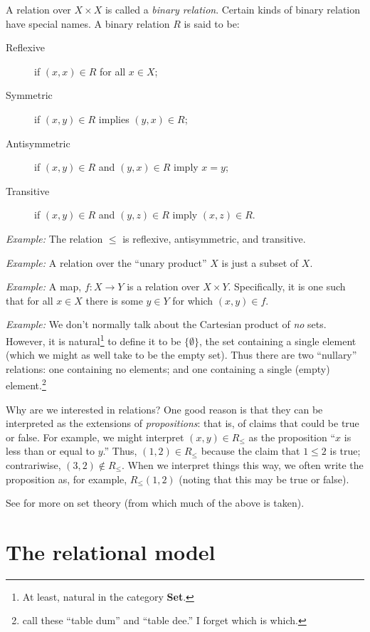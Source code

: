 \documentclass[10pt, a4paper, twocolumn]{article}
\begin{document}
A relation over $X\times X$ is called a \emph{binary relation}. Certain
kinds of binary relation have special names. A binary relation $R$ is said to
be:
\begin{description}
\item[Reflexive] if $(x, x)\in R$ for all $x\in X$;
\item[Symmetric] if $(x, y)\in R$ implies $(y,x)\in R$;
\item[Antisymmetric] if $(x, y)\in R$ and $(y, x)\in R$ imply $x = y$;
\item[Transitive] if $(x, y) \in R$ and $(y, z) \in R$ imply $(x, z) \in R$.
\end{description}

\emph{Example:} The relation $\leq$ is reflexive, antisymmetric, and transitive.

\emph{Example:} A relation over the ``unary product'' $X$ is just a subset of
$X$.

\emph{Example:} A map, $f:X\to Y$ is a relation over $X\times Y$. Specifically, it is
one such that for all $x\in X$ there is some $y\in Y$ for which $(x, y)\in f$.

\emph{Example:} We don't normally talk about the Cartesian product of \emph{no}
sets. However, it is natural\footnote{At least, natural in the category
\textbf{\textsf{Set}}.} to define it to be $\{\emptyset\}$, the set containing a single
element (which we might as well take to be the empty set). Thus there are two
``nullary'' relations: one containing no elements; and one containing a single
(empty) element.\footnote{\textcite{darwendate2006ttm} call these ``table dum''
and ``table dee.'' I forget which is which.}

Why are we interested in relations? One good reason is that they can be
interpreted as the extensions of \emph{propositions}: that is, of claims that
could be true or false. For example, we might interpret $(x, y)\in R_\leq$ as the
proposition ``$x$ is less than or equal to $y$.'' Thus, $(1, 2)\in R_\leq$ because
the claim that $1\leq 2$ is true; contrariwise, $(3, 2)\notin R_\leq$. When we interpret
things this way, we often write the proposition as, for example, $R_\leq(1, 2)$
(noting that this may be true or false).

See \textcite{cameron1999sets} for more on set theory (from which much of the
above is taken).


\section{The relational model}
\end{document}
